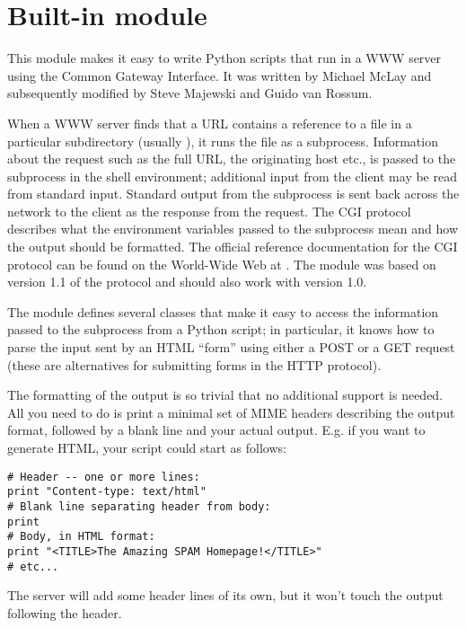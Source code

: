 \section{Built-in module }

This module makes it easy to write Python scripts that run in a WWW
server using the Common Gateway Interface.  It was written by Michael
McLay and subsequently modified by Steve Majewski and Guido van
Rossum.

When a WWW server finds that a URL contains a reference to a file in a
particular subdirectory (usually ), it runs the file as
a subprocess.  Information about the request such as the full URL, the
originating host etc., is passed to the subprocess in the shell
environment; additional input from the client may be read from
standard input.  Standard output from the subprocess is sent back
across the network to the client as the response from the request.
The CGI protocol describes what the environment variables passed to
the subprocess mean and how the output should be formatted.  The
official reference documentation for the CGI protocol can be found on
the World-Wide Web at
.  The
 module was based on version 1.1 of the protocol and should
also work with version 1.0.

The  module defines several classes that make it easy to
access the information passed to the subprocess from a Python script;
in particular, it knows how to parse the input sent by an HTML
``form'' using either a POST or a GET request (these are alternatives
for submitting forms in the HTTP protocol).

The formatting of the output is so trivial that no additional support
is needed.  All you need to do is print a minimal set of MIME headers
describing the output format, followed by a blank line and your actual
output.  E.g. if you want to generate HTML, your script could start as
follows:

\begin{verbatim}
# Header -- one or more lines:
print "Content-type: text/html"
# Blank line separating header from body:
print
# Body, in HTML format:
print "<TITLE>The Amazing SPAM Homepage!</TITLE>"
# etc...
\end{verbatim}

The server will add some header lines of its own, but it won't touch
the output following the header.

